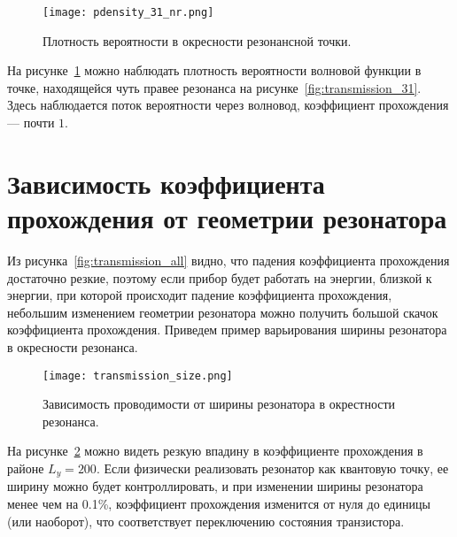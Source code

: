 \begin{figure}[H]
\texttt{[image: pdensity\_31\_nr.png]}
\caption{Плотность вероятности в окресности резонансной точки.}
\label{fig:pdensity_31_nr}
\end{figure}
На рисунке~\ref{fig:pdensity_31_nr} можно наблюдать плотность вероятности волновой функции в точке, находящейся чуть правее резонанса на рисунке~\ref{fig:transmission_31}. Здесь наблюдается поток вероятности через волновод, коэффициент прохождения — почти $1$.

\section{Зависимость коэффициента прохождения от геометрии резонатора}
Из рисунка~\ref{fig:transmission_all} видно, что падения коэффициента прохождения достаточно резкие, поэтому если прибор будет работать на энергии, близкой к энергии, при которой происходит падение коэффициента прохождения, небольшим изменением геометрии резонатора можно получить большой скачок коэффициента прохождения. Приведем пример варьирования ширины резонатора в окресности резонанса.

\begin{figure}[H]
\texttt{[image: transmission\_size.png]}
\caption{Зависимость проводимости от ширины резонатора в окрестности резонанса.}
\label{fig:transmission_size}
\end{figure}
На рисунке~\ref{fig:transmission_size} можно видеть резкую впадину в коэффициенте прохождения в районе $L_y = 200$. Если физически реализовать резонатор как квантовую точку, ее ширину можно будет контроллировать, и при изменении ширины резонатора менее чем на 0.1\%, коэффициент прохождения изменится от нуля до единицы (или наоборот), что соответствует переключению состояния транзистора.

